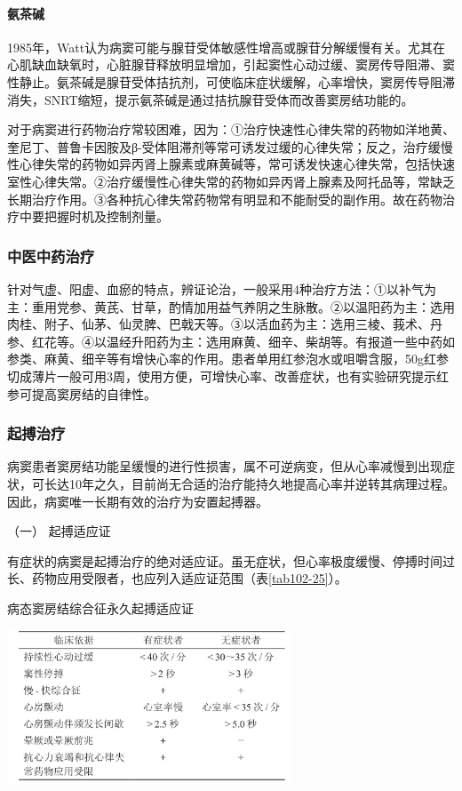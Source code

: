 \paragraph{氨茶碱}

1985年，Watt认为病窦可能与腺苷受体敏感性增高或腺苷分解缓慢有关。尤其在心肌缺血缺氧时，心脏腺苷释放明显增加，引起窦性心动过缓、窦房传导阻滞、窦性静止。氨茶碱是腺苷受体拮抗剂，可使临床症状缓解，心率增快，窦房传导阻滞消失，SNRT缩短，提示氨茶碱是通过拮抗腺苷受体而改善窦房结功能的。

对于病窦进行药物治疗常较困难，因为：①治疗快速性心律失常的药物如洋地黄、奎尼丁、普鲁卡因胺及β-受体阻滞剂等常可诱发过缓的心律失常；反之，治疗缓慢性心律失常的药物如异丙肾上腺素或麻黄碱等，常可诱发快速心律失常，包括快速室性心律失常。②治疗缓慢性心律失常的药物如异丙肾上腺素及阿托品等，常缺乏长期治疗作用。③各种抗心律失常药物常有明显和不能耐受的副作用。故在药物治疗中要把握时机及控制剂量。

\subsubsection{中医中药治疗}

针对气虚、阳虚、血瘀的特点，辨证论治，一般采用4种治疗方法：①以补气为主：重用党参、黄芪、甘草，酌情加用益气养阴之生脉散。②以温阳药为主：选用肉桂、附子、仙茅、仙灵脾、巴戟天等。③以活血药为主：选用三棱、莪术、丹参、红花等。④以温经升阳药为主：选用麻黄、细辛、柴胡等。有报道一些中药如参类、麻黄、细辛等有增快心率的作用。患者单用红参泡水或咀嚼含服，50g红参切成薄片一般可用3周，使用方便，可增快心率、改善症状，也有实验研究提示红参可提高窦房结的自律性。

\subsubsection{起搏治疗}

病窦患者窦房结功能呈缓慢的进行性损害，属不可逆病变，但从心率减慢到出现症状，可长达10年之久，目前尚无合适的治疗能持久地提高心率并逆转其病理过程。因此，病窦唯一长期有效的治疗为安置起搏器。

\hypertarget{text00298.htmlux5cux23CHP10-2-11-4-4-1}{}
（一） 起搏适应证

有症状的病窦是起搏治疗的绝对适应证。虽无症状，但心率极度缓慢、停搏时间过长、药物应用受限者，也应列入适应证范围（表\ref{tab102-25}）。

\begin{table}[htbp]
\centering
\caption{病态窦房结综合征永久起搏适应证}
\label{tab102-25}
\includegraphics[width=3.3125in,height=1.8125in]{./images/Image00467.jpg}
\end{table}

